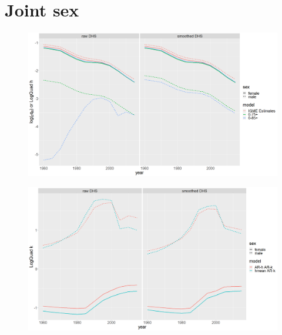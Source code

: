 \documentclass[12pt,a4paper]{article}
\begin{document}
\section*{\centering Joint sex}
\begin{figure}[H]
\includegraphics[width = \linewidth]{Burkina Faso/7/joint h.png}
\end{figure}
\begin{figure}[H]
\includegraphics[width = \linewidth]{Burkina Faso/7/joint k.png}
\end{figure}

\newpage
\end{document}
